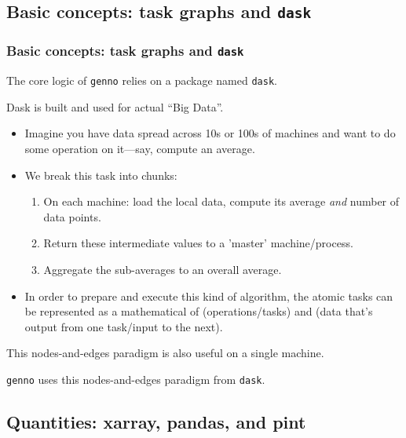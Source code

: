 \documentclass[12pt,aspectratio=169]{beamer}
\renewcommand{\mod}[1]{\texttt{#1}}
\begin{document}
\subsection{Basic concepts: task graphs and \texttt{dask}}

\begin{frame}[allowframebreaks]
\frametitle{Basic concepts: task graphs and \texttt{dask}}
The core logic of \mod{genno} relies on a package named \mod{dask}.

\medskip
Dask is built and used for actual “Big Data”.
\begin{itemize}
  \item Imagine you have data spread across 10s or 100s of machines
    and want to do some operation on it—say, compute an average.
  \item We break this task into chunks:
    \begin{enumerate}
      \item On each machine: load the local data,
        compute its average \emph{and} number of data points.
      \item Return these intermediate values to a 'master' machine/process.
      \item Aggregate the sub-averages to an overall average.
    \end{enumerate}
  \item In order to prepare and execute this kind of algorithm,
    the atomic tasks can be represented as a mathematical 
    of  (operations/tasks)
    and  (data that's output from one task/input to the next).
\end{itemize}

\framebreak

This nodes-and-edges paradigm is also useful on a single machine.

\mod{genno} uses this nodes-and-edges paradigm from \mod{dask}.

\end{frame}

\subsection{Quantities: xarray, pandas, and pint}
\end{document}
